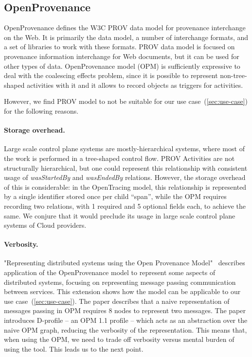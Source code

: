 \subsection{OpenProvenance}

OpenProvenance defines the W3C PROV data model for provenance interchange on the Web. It is primarily the data model, a number of interchange formats, and a set of libraries to work with these formats. PROV data model is focused on provenance information interchange for Web documents, but it can be used for other types of data. OpenProvenance model (OPM) is sufficiently expressive to deal with the coalescing effects problem, since it is possible to represent non-tree-shaped activities with it and it allows to record objects as triggers for activities.

However, we find PROV model to not be suitable for our use case~(\cref{sec:use-case}) for the following reasons.
%
\paragraph*{Storage overhead.} Large scale control plane systems are mostly-hierarchical systems, where most of the work is performed in a tree-shaped control flow. PROV Activities are not structurally hierarchical, but one could represent this relationship with consistent usage of \textit{wasStartedBy} and \textit{wasEndedBy} relations. However, the storage overhead of this is considerable: in the OpenTracing model, this relationship is represented by a single identifier stored once per child ``span'', while the OPM requires recording two relations, with 1 required and 5 optional fields each, to achieve the same. We conjure that it would preclude its usage in large scale control plane systems of Cloud providers.

\paragraph*{Verbosity.} "Representing distributed systems using the Open Provenance Model"~\cite{distributed-prov-Groth2011Jun} describes application of the OpenProvenance model to represent some aspects of distributed systems, focusing on representing message passing communication between services. This extension shows how the model can be applicable to our use case~(\cref{sec:use-case}). The paper describes that a naive representation of messages passing in OPM requires 8 nodes to represent two messages. The paper introduces D-profile -- an OPM 1.1 profile -- which acts as an abstraction over the naive OPM graph, reducing the verbosity of the representation. This means that, when using the OPM, we need to trade off verbosity versus mental burden of using the tool. This leads us to the next point.

